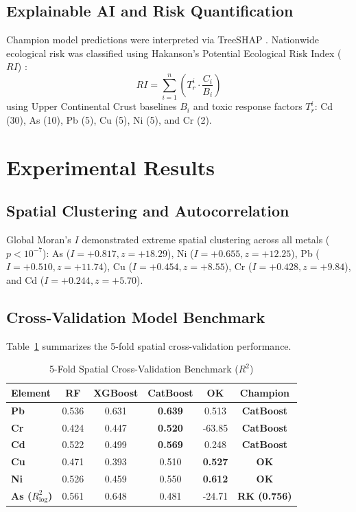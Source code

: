 \documentclass[conference]{IEEEtran}
\begin{document}
\subsection{Explainable AI and Risk Quantification}
Champion model predictions were interpreted via TreeSHAP \cite{Lundberg2020}. Nationwide ecological risk was classified using Hakanson's Potential Ecological Risk Index ($RI$) \cite{Hakanson1980}:
\begin{equation}
RI = \sum_{i=1}^n \left( T_r^i \cdot \frac{C_i}{B_i} \right)
\end{equation}
using Upper Continental Crust baselines $B_i$ \cite{Wedepohl1995} and toxic response factors $T_r^i$: Cd (30), As (10), Pb (5), Cu (5), Ni (5), and Cr (2).

\section{Experimental Results}

\subsection{Spatial Clustering and Autocorrelation}
Global Moran's $I$ demonstrated extreme spatial clustering across all metals ($p < 10^{-7}$): As ($I = +0.817, z = +18.29$), Ni ($I = +0.655, z = +12.25$), Pb ($I = +0.510, z = +11.74$), Cu ($I = +0.454, z = +8.55$), Cr ($I = +0.428, z = +9.84$), and Cd ($I = +0.244, z = +5.70$).

\subsection{Cross-Validation Model Benchmark}
Table~\ref{tab:results} summarizes the 5-fold spatial cross-validation performance.

\begin{table}[htbp]
\centering
\caption{5-Fold Spatial Cross-Validation Benchmark ($R^2$)}
\label{tab:results}
\begin{tabular}{lccccc}
\toprule
Element & RF & XGBoost & CatBoost & OK & Champion \\
\midrule
\textbf{Pb} & 0.536 & 0.631 & \textbf{0.639} & 0.513 & \textbf{CatBoost} \\
\textbf{Cr} & 0.424 & 0.447 & \textbf{0.520} & -63.85 & \textbf{CatBoost} \\
\textbf{Cd} & 0.522 & 0.499 & \textbf{0.569} & 0.248 & \textbf{CatBoost} \\
\textbf{Cu} & 0.471 & 0.393 & 0.510 & \textbf{0.527} & \textbf{OK} \\
\textbf{Ni} & 0.526 & 0.459 & 0.550 & \textbf{0.612} & \textbf{OK} \\
\textbf{As ($R^2_{\log}$)} & 0.561 & 0.648 & 0.481 & -24.71 & \textbf{RK (0.756)} \\
\bottomrule
\end{tabular}
\end{table}
\end{document}
